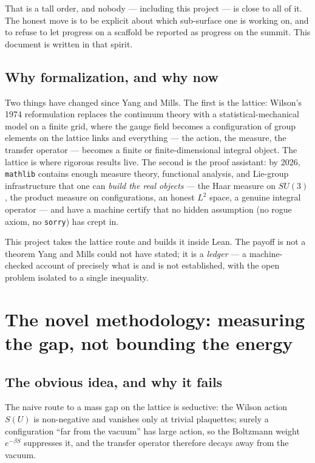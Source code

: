 \documentclass[11pt]{article}
\newcommand{\code}[1]{\texttt{#1}}
\begin{document}
That is a tall order, and nobody --- including this project --- is
close to all of it. The honest move is to be explicit about which
sub-surface one is working on, and to refuse to let progress on a
scaffold be reported as progress on the summit. This document is
written in that spirit.

\subsection{Why formalization, and why now}

Two things have changed since Yang and Mills. The first is the
lattice: Wilson's 1974 reformulation replaces the continuum theory
with a statistical-mechanical model on a finite grid, where the
gauge field becomes a configuration of group elements on the lattice
links and everything --- the action, the measure, the transfer
operator --- becomes a finite or finite-dimensional integral object.
The lattice is where rigorous results live. The second is the proof
assistant: by 2026, \code{mathlib} contains enough measure theory,
functional analysis, and Lie-group infrastructure that one can
\emph{build the real objects} --- the Haar measure on $SU(3)$, the
product measure on configurations, an honest $L^2$ space, a genuine
integral operator --- and have a machine certify that no hidden
assumption (no rogue axiom, no \code{sorry}) has crept in.

This project takes the lattice route and builds it inside Lean. The
payoff is not a theorem Yang and Mills could not have stated; it is a
\emph{ledger} --- a machine-checked account of precisely what is and
is not established, with the open problem isolated to a single
inequality.

\section{The novel methodology: measuring the gap, not bounding the energy}

\subsection{The obvious idea, and why it fails}

The naive route to a mass gap on the lattice is seductive: the
Wilson action $S(U)$ is non-negative and vanishes only at trivial
plaquettes; surely a configuration ``far from the vacuum'' has large
action, so the Boltzmann weight $e^{-\beta S}$ suppresses it, and the
transfer operator therefore decays away from the vacuum.
\end{document}
